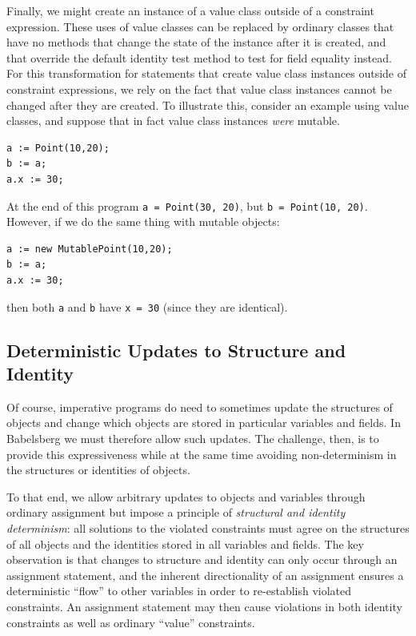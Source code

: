 Finally, we might create an instance of a value class outside of a
constraint expression.  These uses of value classes can be replaced by
ordinary classes that have no methods that change the state of the
instance after it is created, and that override the default identity
test method to test for field equality instead.  For this
transformation for statements that create value class instances
outside of constraint expressions, we rely on the fact that value
class instances cannot be changed after they are created.  To
illustrate this, consider an example using value classes, and suppose
that in fact value class instances \emph{were} mutable.

\begin{lstlisting}
a := Point(10,20);
b := a;
a.x := 30;
\end{lstlisting}
At the end of this program \verb|a = Point(30, 20)|, but
\verb|b = Point(10, 20)|.  However, if we do the same thing with
mutable objects:
\begin{lstlisting}
a := new MutablePoint(10,20);
b := a;
a.x := 30;
\end{lstlisting}
then both \verb|a| and \verb|b| have \verb|x = 30| (since they are
identical).

\subsection{Deterministic Updates to Structure and Identity}
\label{sec:determinism}

Of course, imperative programs do need to sometimes update the
structures of objects and change which objects are stored in
particular variables and fields.  In Babelsberg we must therefore
allow such updates.  The challenge, then, is to provide this
expressiveness while at the same time avoiding non-determinism in the
structures or identities of objects.

To that end, we allow arbitrary updates to objects and variables
through ordinary assignment but impose a principle of \emph{structural
  and identity determinism}: all solutions to the violated constraints
must agree on the structures of all objects and the identities stored
in all variables and fields. The key observation is that changes to
structure and identity can only occur through an assignment statement,
and the inherent directionality of an assignment ensures a
deterministic ``flow'' to other variables in order to re-establish
violated constraints. An assignment statement may then cause
violations in both identity constraints as well as ordinary ``value''
constraints. 

